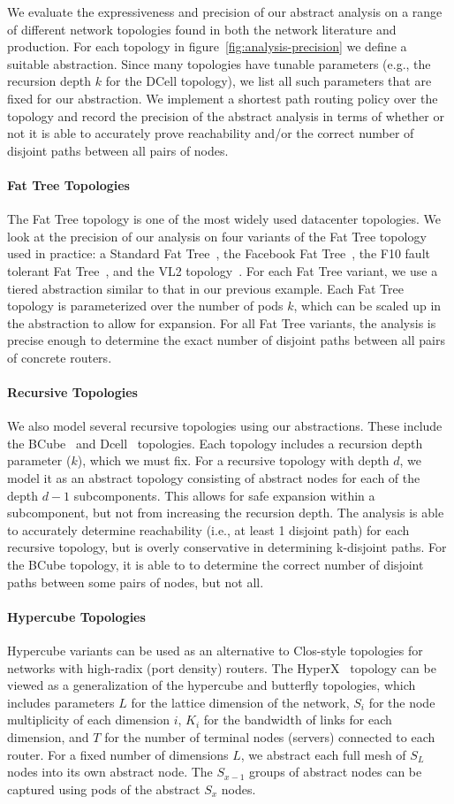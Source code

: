 \documentclass[numbers, 10pt, preprint]{sigplanconf}
\newcommand{\para}[1]{\paragraph*{\textbf{#1}}}
\begin{document}
We evaluate the expressiveness and precision of our abstract analysis on a range of different network topologies found in both the network literature and production. For each topology in figure~\ref{fig:analysis-precision} we define a suitable abstraction. Since many topologies have tunable parameters (e.g., the recursion depth $k$ for the DCell topology), we list all such parameters that are fixed for our abstraction. We implement a shortest path routing policy over the topology and record the precision of the abstract analysis in terms of whether or not it is able to accurately prove reachability and/or the correct number of disjoint paths between all pairs of nodes.

\para{Fat Tree Topologies}

The Fat Tree topology is one of the most widely used datacenter topologies. We look at the precision of our analysis on four variants of the Fat Tree topology used in practice: a Standard Fat Tree~\cite{fattree}, the Facebook Fat Tree~\cite{facebook-fattree}, the F10 fault tolerant Fat Tree~\cite{f10-fattree}, and the VL2 topology~\cite{vl2-fattree}. For each Fat Tree variant, we use a tiered abstraction similar to that in our previous example. Each Fat Tree topology is parameterized over the number of pods $k$, which can be scaled up in the abstraction to allow for expansion. For all Fat Tree variants, the analysis is precise enough to determine the exact number of disjoint paths between all pairs of concrete routers.

\para{Recursive Topologies}

We also model several recursive topologies using our abstractions. These include the BCube~\cite{bcube} and Dcell~\cite{dcell} topologies. Each topology includes a recursion depth parameter ($k$), which we must fix. For a recursive topology with depth $d$, we model it as an abstract topology consisting of abstract nodes for each of the depth $d-1$ subcomponents. This allows for safe expansion within a subcomponent, but not from increasing the recursion depth. The analysis is able to accurately determine reachability (i.e., at least 1 disjoint path) for each recursive topology, but is overly conservative in determining k-disjoint paths. For the BCube topology, it is able to to determine the correct number of disjoint paths between some pairs of nodes, but not all.

\para{Hypercube Topologies}

Hypercube variants can be used as an alternative to Clos-style topologies for networks with high-radix (port density) routers. The HyperX~\cite{hyperx} topology can be viewed as a generalization of the hypercube and butterfly topologies, which includes parameters $L$ for the lattice dimension of the network, $S_i$ for the node multiplicity of each dimension $i$, $K_i$ for the bandwidth of links for each dimension, and $T$ for the number of terminal nodes (servers) connected to each router. For a fixed number of dimensions $L$, we abstract each full mesh of $S_L$ nodes into its own abstract node. The $S_{x-1}$ groups of abstract nodes can be captured using pods of the abstract $S_x$ nodes.
\end{document}
